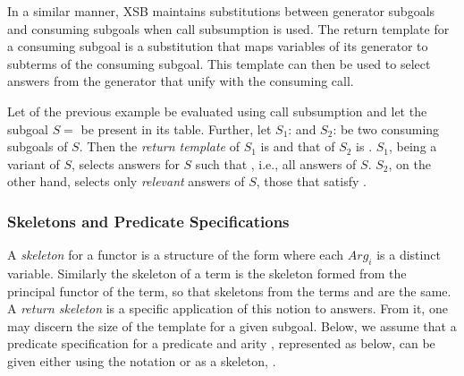 In a similar manner, XSB maintains substitutions between generator
subgoals and consuming subgoals when call subsumption is used.  The
return template for a consuming subgoal is a substitution that maps
variables of its generator to subterms of the consuming subgoal.  This
template can then be used to select answers from the generator that
unify with the consuming call.  

\begin{example}
Let  of the previous example be evaluated using call
subsumption and let the subgoal $S =$  be present in
its table.  Further, let $S_1$:  and $S_2$:
 be two consuming subgoals of $S$\@.  Then the
\emph{return template} of $S_1$ is  and that of $S_2$
is .  $S_1$, being a variant of $S$, selects answers
for $S$ such that \@, i.e., all answers of $S$.
$S_2$, on the other hand, selects only \emph{relevant} answers of $S$,
those that satisfy .\fillBox
\end{example}


\subsubsection*{Skeletons and Predicate Specifications}


A \emph{skeleton} for a functor  is a structure of the form
 where each $Arg_i$ is a distinct
variable.  Similarly the skeleton of a term is the skeleton formed
from the principal functor of the term, so that skeletons from the
terms  and  are the same.  A \emph{return
  skeleton} is a specific application of this notion to answers.  From
it, one may discern the size of the template for a given subgoal.
Below, we assume that a predicate specification for a predicate
 and arity , represented as  below, can
be given either using the notation  or as a skeleton,
.

